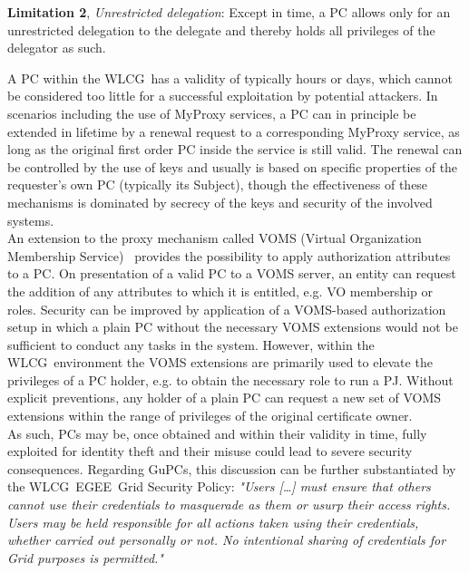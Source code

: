 \documentclass[10pt]{iopart}
\newcommand{\wlcg}{WLCG}
\newcommand{\egee}{EGEE}
\begin{document}
\noindent
\textbf{Limitation 2}, \textit{Unrestricted delegation}: 
Except in time, a PC allows only for an unrestricted delegation to the
delegate and thereby holds all privileges of the delegator as such.\\
\par
\endgroup\noindent
A PC within the \wlcg\ has a validity of typically hours or days, which
cannot be considered too little for a successful 
exploitation by potential attackers. In scenarios including the use of MyProxy
services, a PC can in principle be extended in
lifetime by a renewal request to a corresponding MyProxy service, as long as the
original first order PC inside the service is still valid. The renewal
can be controlled by the use of keys and usually is based on specific properties
of the requester's own PC (typically its Subject),
though the effectiveness of these mechanisms is
dominated by secrecy of the keys and security of the involved systems.\\
An extension to the proxy mechanism called VOMS (Virtual Organization
Membership Service)~\cite{voms} provides the possibility to apply authorization attributes
to a PC. On presentation of a valid PC to a VOMS server,
an entity can request the addition of any attributes to which it is entitled,
e.g. VO membership or roles. Security can be improved by application of a VOMS-based
authorization setup in which a plain PC without the necessary VOMS extensions
would not be sufficient to conduct any tasks in the system.
However, within the \wlcg\ environment
the VOMS extensions are primarily
used to elevate the privileges of a PC holder, e.g. to obtain the necessary role
to run a PJ. Without explicit preventions, any holder
of a plain PC can request a new set of VOMS extensions within the range of
privileges of the original certificate owner.\\
As such, PCs may be, once obtained and within their validity in time,
fully exploited for identity theft and their misuse could lead to severe security
consequences. Regarding GuPCs, this discussion can be further
substantiated by the \wlcg\ \egee\ Grid Security Policy: \textit{"Users
[\ldots] must ensure that others cannot use their credentials to masquerade as
them or usurp their access rights. Users may be held responsible for all actions
taken using their credentials, whether carried out personally or not. No intentional
sharing of credentials for Grid
purposes is
permitted."}\\
\end{document}
